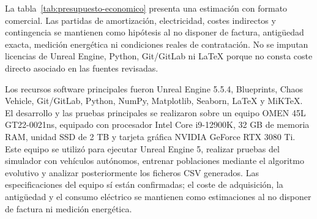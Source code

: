 La tabla~\ref{tab:presupuesto-economico} presenta una estimación con formato comercial. Las partidas de amortización, electricidad, costes indirectos y contingencia se mantienen como hipótesis al no disponer de factura, antigüedad exacta, medición energética ni condiciones reales de contratación. No se imputan licencias de Unreal Engine, Python, Git/GitLab ni LaTeX porque no consta coste directo asociado en las fuentes revisadas.

Los recursos software principales fueron Unreal Engine 5.5.4, Blueprints, Chaos Vehicle, Git/GitLab, Python, NumPy, Matplotlib, Seaborn, LaTeX y MiKTeX. El desarrollo y las pruebas principales se realizaron sobre un equipo OMEN 45L GT22-0021ns, equipado con procesador Intel Core i9-12900K, 32 GB de memoria RAM, unidad SSD de 2 TB y tarjeta gráfica NVIDIA GeForce RTX 3080 Ti. Este equipo se utilizó para ejecutar Unreal Engine 5, realizar pruebas del simulador con vehículos autónomos, entrenar poblaciones mediante el algoritmo evolutivo y analizar posteriormente los ficheros CSV generados. Las especificaciones del equipo sí están confirmadas; el coste de adquisición, la antigüedad y el consumo eléctrico se mantienen como estimaciones al no disponer de factura ni medición energética.


